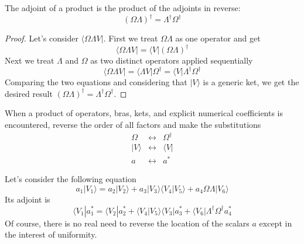 \documentclass[11pt,fleqn]{book} %
\newcommand{\bra}[1]{\langle #1|}
\newcommand{\ket}[1]{| #1\rangle}
\newcommand{\scalar}[2]{\langle #1| #2\rangle}
\begin{document}
\begin{theorem}
    The adjoint of a product is the product of the adjoints in reverse:
    \begin{equation}
        \left(\Omega\Lambda\right)^\dagger=\Lambda^\dagger\Omega^\dagger
    \end{equation}
\end{theorem}
\begin{proof}
    Let's consider $\bra{\Omega\Lambda V}$. First we treat $\Omega\Lambda$ as one operator and get
    \begin{equation*}
        \bra{\Omega\Lambda V} = \bra{V}\left(\Omega\Lambda\right)^\dagger
    \end{equation*}
    Next we treat $\Lambda$ and $\Omega$ as two distinct operators applied sequentially
    \begin{equation*}
        \bra{\Omega\Lambda V} = \bra{\Lambda V}\Omega^\dagger = \bra{V}\Lambda^\dagger\Omega^\dagger
    \end{equation*}
    Comparing the two equations and considering that $\ket{V}$ is a generic ket,
    we get the desired result $\left(\Omega\Lambda\right)^\dagger=\Lambda^\dagger\Omega^\dagger$.
\end{proof}


When a product of operators, bras, kets, and explicit numerical coefficients is encountered, reverse
the order of all factors and make the substitutions
\begin{eqnarray}
    \nonumber
    \Omega&\leftrightarrow&\Omega^\dagger
    \\
    \ket{V}&\leftrightarrow&\bra{V}
    \\\nonumber
    a&\leftrightarrow&a^*
\end{eqnarray}

\begin{example}
    Let's consider the following equation
    \begin{equation*}
        a_1\ket{V_1} = a_2\ket{V_2} + a_3\ket{V_3}\scalar{V_4}{V_5}+ a_4\Omega\Lambda\ket{V_6} 
    \end{equation*}
    Its adjoint is
    \begin{equation*}
        \bra{V_1}a^*_1 = \bra{V_2}a^*_2+ \scalar{V_4}{V_5}\bra{V_3}a^*_3+ \bra{V_6}\Lambda^\dagger\Omega^\dagger a_4^*
    \end{equation*}
    Of course, there is no real need to reverse the location of the scalars $a$ except in the interest of uniformity.
\end{example}
\end{document}
